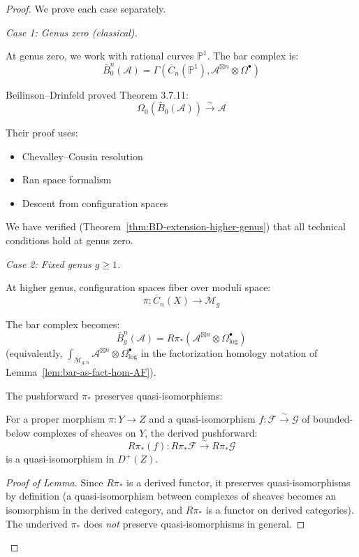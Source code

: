 \begin{proof}
We prove each case separately.

\emph{Case 1: Genus zero (classical).}

At genus zero, we work with rational curves $\mathbb{P}^1$. The bar complex is:
\[\bar{B}_0^n(\mathcal{A}) = \Gamma\left(\overline{C}_n(\mathbb{P}^1), 
\mathcal{A}^{\boxtimes n} \otimes \Omega^\bullet\right)\]

Beilinson--Drinfeld proved \cite{BD04} Theorem 3.7.11:
\[\Omega_0(\bar{B}_0(\mathcal{A})) \xrightarrow{\sim} \mathcal{A}\]

Their proof uses:
\begin{itemize}
\item Chevalley--Cousin resolution
\item Ran space formalism
\item Descent from configuration spaces
\end{itemize}

We have verified (Theorem~\ref{thm:BD-extension-higher-genus}) that all technical 
conditions hold at genus zero.

\emph{Case 2: Fixed genus $g \geq 1$.}

At higher genus, configuration spaces fiber over moduli space:
\[\pi: \overline{C}_n(X) \to \overline{\mathcal{M}}_g\]

The bar complex becomes:
\[\bar{B}_g^n(\mathcal{A}) = R\pi_*\left(\mathcal{A}^{\boxtimes n} \otimes \Omega^\bullet_{\log}\right)\]
(equivalently, $\int_{\overline{\mathcal{M}}_{g,n}} \mathcal{A}^{\boxtimes n} \otimes \Omega^\bullet_{\log}$ in the factorization homology notation of Lemma~\ref{lem:bar-as-fact-hom-AF}).

The pushforward $\pi_*$ preserves quasi-isomorphisms:

\begin{lemma}\label{lem:pushforward-preserves-qi}
For a proper morphism $\pi: Y \to Z$ and a quasi-isomorphism $f: \mathcal{F} \xrightarrow{\sim} \mathcal{G}$
of bounded-below complexes of sheaves on $Y$, the derived pushforward:
\[R\pi_*(f): R\pi_*\mathcal{F} \xrightarrow{\sim} R\pi_*\mathcal{G}\]
is a quasi-isomorphism in $D^+(Z)$.
\end{lemma}

\begin{proof}[Proof of Lemma]
Since $R\pi_*$ is a derived functor, it preserves quasi-isomorphisms by definition (a quasi-isomorphism between complexes of sheaves becomes an isomorphism in the derived category, and $R\pi_*$ is a functor on derived categories).  The underived $\pi_*$ does \emph{not} preserve quasi-isomorphisms in general.


\end{proof}
\end{proof}
